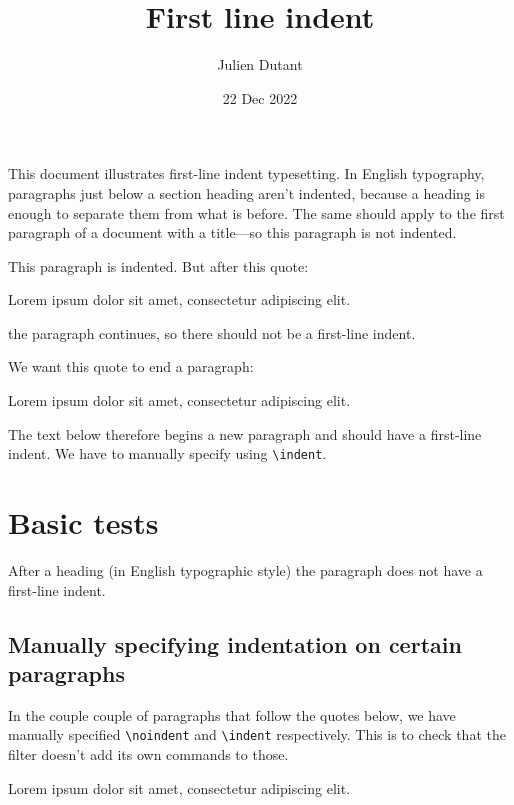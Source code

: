\documentclass[
]{article}
\title{First line indent}
\author{Julien Dutant}
\date{22 Dec 2022}
\makeatletter
\renewenvironment{quote}
     {\list{}{\listparindent 1.5em%
              \itemindent \listparindent
              \rightmargin \leftmargin
              \parsep \z@ \@plus \p@}%
            \item\noindent\relax}
      {\endlist}
\makeatother
\begin{document}
\maketitle

\noindent This document illustrates first-line indent typesetting. In
English typography, paragraphs just below a section heading aren't
indented, because a heading is enough to separate them from what is
before. The same should apply to the first paragraph of a document with
a title---so this paragraph is not indented.

This paragraph is indented. But after this quote:

\begin{quote}
\noindent Lorem ipsum dolor sit amet, consectetur adipiscing elit.
\end{quote}

\noindent the paragraph continues, so there should not be a first-line
indent.

We want this quote to end a paragraph:

\begin{quote}
\noindent Lorem ipsum dolor sit amet, consectetur adipiscing elit.
\end{quote}

\noindent The text below therefore begins a new paragraph and should
have a first-line indent. We have to manually specify using
\texttt{\textbackslash{}indent}.

\hypertarget{basic-tests}{%
\section{Basic tests}\label{basic-tests}}

After a heading (in English typographic style) the paragraph does not
have a first-line indent.

\hypertarget{manually-specifying-indentation-on-certain-paragraphs}{%
\subsection{Manually specifying indentation on certain
paragraphs}\label{manually-specifying-indentation-on-certain-paragraphs}}

In the couple couple of paragraphs that follow the quotes below, we have
manually specified \texttt{\textbackslash{}noindent} and
\texttt{\textbackslash{}indent} respectively. This is to check that the
filter doesn't add its own commands to those.

\begin{quote}
\noindent Lorem ipsum dolor sit amet, consectetur adipiscing elit.
\end{quote}
\end{document}
